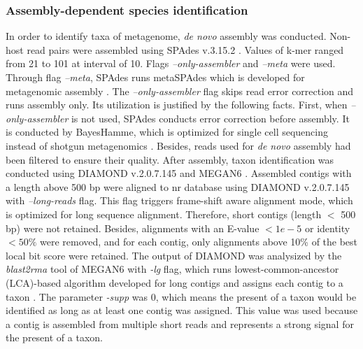 \documentclass[11pt]{article}
\begin{document}
    \subsubsection{Assembly-dependent species identification}
    \label{AssemblyDependent}
    In order to identify taxa of metagenome, \textit{de novo} assembly was conducted. 
    Non-host read pairs were assembled using SPAdes v.3.15.2 \citep{prjibelski2020using}. 
    Values of k-mer ranged from 21 to 101 at interval of 10. 
    Flags \textit{--only-assembler} and \textit{--meta} were used. 
    Through flag \textit{--meta}, SPAdes runs metaSPAdes which is developed for metagenomic assembly \citep{nurk2017metaspades}. 
    The \textit{--only-assembler} flag skips read error correction and runs assembly only. 
    Its utilization is justified by the following facts. 
    First, when \textit{--only-assembler} is not used, SPAdes conducts error correction before assembly. 
    It is conducted by BayesHamme, which is optimized for single cell sequencing instead of shotgun metagenomics \citep{nikolenko2013bayeshammer}. 
    Besides, reads used for \textit{de novo} assembly had been filtered to ensure their quality.
    \newline
    After assembly, taxon identification was conducted using DIAMOND v.2.0.7.145 \citep{buchfink2015fast} and MEGAN6 \citep{huson2007megan}. 
    Assembled contigs with a length above 500 bp were aligned to nr database using DIAMOND v.2.0.7.145 with \textit{--long-reads} flag. 
    This flag triggers frame-shift aware alignment mode, which is optimized for long sequence alignment. 
    Therefore, short contigs (length $<$ 500 bp) were not retained. 
    Besides, alignments with an E-value $< 1e-5$ or identity $< 50\%$ were removed, and for each contig, only alignments above 10\% of the best local bit score were retained. 
    The output of DIAMOND was analysized by the \textit{blast2rma} tool of MEGAN6 with \textit{-lg} flag, which runs lowest-common-ancestor (LCA)-based algorithm developed for long contigs and assigns each contig to a taxon \citep{huson2018megan}. 
    The parameter \textit{-supp} was 0, which means the present of a taxon would be identified as long as at least one contig was assigned. 
    This value was used because a contig is assembled from multiple short reads and represents a strong signal for the present of a taxon.
    
\end{document}

